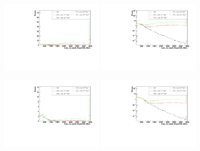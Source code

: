 \begin{figure}[h]
  \begin{center}
	\includegraphics[width=0.45\textwidth]{Plots/aQGC_kinematics/mass_lvj_type0_PuppiAK8_39bin_FT1.pdf}%
	\includegraphics[width=0.45\textwidth]{Plots/aQGC_kinematics/mass_lvj_type0_PuppiAK8_39bin_FT1_log.pdf}\\	
    \caption{}
  \end{center}
\end{figure}
\begin{figure}[h]
  \begin{center}
	\includegraphics[width=0.45\textwidth]{Plots/aQGC_kinematics/mass_lvj_type0_PuppiAK8_39bin_FT2.pdf}%
	\includegraphics[width=0.45\textwidth]{Plots/aQGC_kinematics/mass_lvj_type0_PuppiAK8_39bin_FT2_log.pdf}\\	
    \caption{}
  \end{center}
\end{figure}
